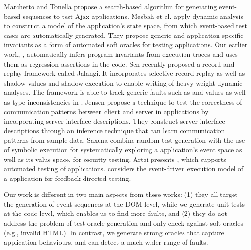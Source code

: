 Marchetto and Tonella \cite{marchetto:search} propose a search-based algorithm for generating event-based sequences to test Ajax applications. 
Mesbah et al.  \cite{mesbah:tweb11} apply dynamic analysis to construct a model of the application's state space, from which event-based test cases are automatically generated. They propose \cite{mesbah:tse12} generic and application-specific invariants as a form of automated soft oracles for testing \ajax applications.  Our earlier work, \jsart \cite{mirshokraie:icwe12},  automatically infers program invariants from \javascript execution traces and uses them as regression assertions in the code. 
Sen \etal \cite{sen:fse13} recently proposed a record and replay framework called Jalangi. It incorporates selective record-replay as well as shadow values and shadow execution to enable writing of heavy-weight dynamic analyses.
The framework is able to track generic faults such as  and  values as well as type inconsistencies in \javascript. 
Jensen \etal \cite{jensen:fse13} propose a technique to test the correctness of communication patterns between client and server in \ajax applications by incorporating server interface descriptions.
They construct server interface descriptions through an inference technique that can learn communication patterns from sample data.
Saxena \etal \cite{song:symb10} combine random test generation with the use of symbolic execution for systematically exploring a \javascript application's event space as well as its value space, for security testing.  Artzi \etal presents \artemis \cite{artzi:icse11}, which supports automated testing of \javascript applications.
\artemis considers the event-driven execution model of a \javascript application for feedback-directed testing.

Our work is different in two main aspects from these works: (1) they all target the generation of event sequences at the DOM level, while we generate unit tests at the \javascript code level, which enables us to find more faults,
and (2) they do not address the problem of test oracle generation and only check against soft oracles (e.g., invalid HTML). In contrast, we generate strong oracles that capture
application behaviours, and can detect a much wider range of faults.

